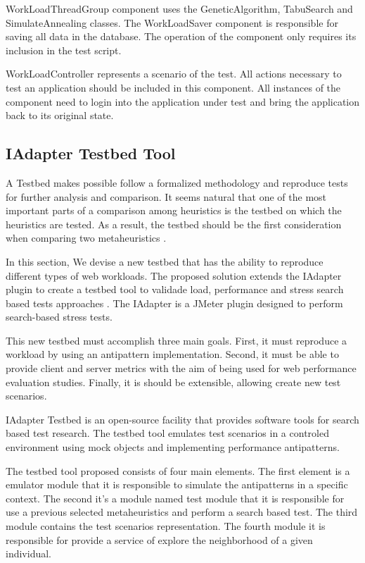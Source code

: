 WorkLoadThreadGroup component uses the GeneticAlgorithm, TabuSearch and SimulateAnnealing classes.  The WorkLoadSaver component is responsible for saving all data in the database. The operation of the component only requires its inclusion in the test script.

WorkLoadController represents a scenario of the test. All actions necessary to test an application should be included in this component. All instances of the component need to login into the application under test and bring the application back to its original state.


\subsection{IAdapter Testbed Tool}

A Testbed makes possible follow a formalized methodology and reproduce tests for further analysis and comparison. It seems natural that one of the most important parts of a comparison among heuristics is the testbed on which the heuristics are tested. As a result, the testbed should be the first consideration when comparing two metaheuristics \cite{GendreauMichelandPotvin2010}. 

In this section, We devise a new testbed that has the ability to reproduce different types of web workloads.  The proposed solution extends the IAdapter  plugin to create a testbed tool to validade load, performance and stress search based tests approaches \cite{Gois2016}. The IAdapter is a JMeter plugin designed to perform search-based stress tests. 

This new testbed must accomplish three main goals. First, it must reproduce a workload by using an antipattern implementation. Second, it must be able to provide client and server metrics with the aim of being used for web performance evaluation studies. Finally, it is should be extensible, allowing create new test scenarios.

IAdapter Testbed is an open-source facility that provides software tools for search based test research. The testbed tool emulates test scenarios in a controled environment using mock objects and implementing performance antipatterns. 

The testbed tool proposed consists of four main elements. The first element is a emulator module that it is responsible to simulate the antipatterns in a specific context. The second it's a module named test module that it is responsible for use a previous selected metaheuristics and perform a search based test. The third module contains the test scenarios representation. The fourth module it is responsible for provide a service of explore the neighborhood of a given individual. 



